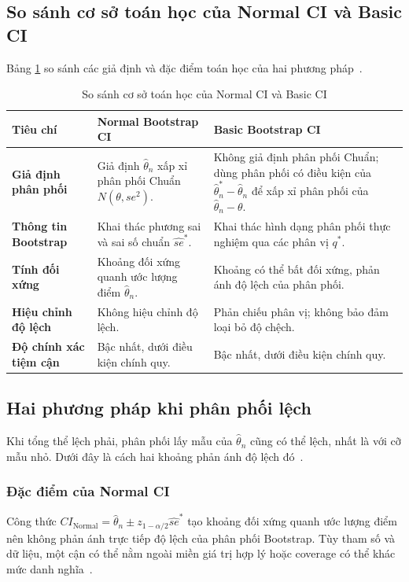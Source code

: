 \documentclass[12pt,a4paper]{article}
\theoremstyle{definition}
\numberwithin{equation}{section}
\begin{document}
	\subsection{So sánh cơ sở toán học của Normal CI và Basic CI}
	Bảng \ref{tab:comparison_math} so sánh các giả định và đặc điểm toán học của hai phương pháp~\cite{rizzo2019,efron1993,davison1997,justus2024}.
	\begin{table}[htbp]
		\centering
		\renewcommand{\arraystretch}{1.4}
		\setlength{\tabcolsep}{6pt}
		\caption{So sánh cơ sở toán học của Normal CI và Basic CI}
		\label{tab:comparison_math}
		\begin{tabular}{>{\raggedright\arraybackslash}p{3.2cm}>{\raggedright\arraybackslash}p{6.0cm}>{\raggedright\arraybackslash}p{6.0cm}}
			\toprule
			\textbf{Tiêu chí} & \textbf{Normal Bootstrap CI} & \textbf{Basic Bootstrap CI} \\
			\midrule
			\textbf{Giả định phân phối} & Giả định $\hat{\theta}_n$ xấp xỉ phân phối Chuẩn $N(\theta, se^2)$. & Không giả định phân phối Chuẩn; dùng phân phối có điều kiện của $\hat\theta_n^*-\hat\theta_n$ để xấp xỉ phân phối của $\hat\theta_n-\theta$. \\
			\textbf{Thông tin Bootstrap} & Khai thác phương sai và sai số chuẩn $\widehat{se}^*$. & Khai thác hình dạng phân phối thực nghiệm qua các phân vị $q^*$. \\
			\textbf{Tính đối xứng} & Khoảng đối xứng quanh ước lượng điểm $\hat{\theta}_n$. & Khoảng có thể bất đối xứng, phản ánh độ lệch của phân phối. \\
			\textbf{Hiệu chỉnh độ lệch} & Không hiệu chỉnh độ lệch. & Phản chiếu phân vị; không bảo đảm loại bỏ độ chệch. \\
			\textbf{Độ chính xác tiệm cận} & Bậc nhất, dưới điều kiện chính quy. & Bậc nhất, dưới điều kiện chính quy. \\
			\bottomrule
		\end{tabular}
	\end{table}

	\subsection{Hai phương pháp khi phân phối lệch}

Khi tổng thể lệch phải, phân phối lấy mẫu của $\hat{\theta}_n$ cũng có thể lệch, nhất là với cỡ mẫu nhỏ. Dưới đây là cách hai khoảng phản ánh độ lệch đó~\cite[tr. 197--199]{davison1997}.

	\subsubsection{Đặc điểm của Normal CI}
Công thức $CI_{\text{Normal}} = \hat{\theta}_n \pm z_{1-\alpha/2}\widehat{se}^*$ tạo khoảng đối xứng quanh ước lượng điểm nên không phản ánh trực tiếp độ lệch của phân phối Bootstrap. Tùy tham số và dữ liệu, một cận có thể nằm ngoài miền giá trị hợp lý hoặc coverage có thể khác mức danh nghĩa~\cite{efron1993,davison1997}.
\end{document}
